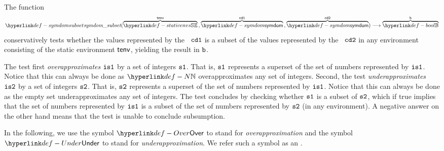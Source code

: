 \hypertarget{def-symdomsubset}{}
The function
\[
  \symdomsubset(
    \overname{\staticenvs}{\tenv} \aslsep
    \overname{\symdom}{\cdone} \aslsep
    \overname{\symdom}{\cdtwo}
  ) \aslto
  \overname{\Bool}{\vb}
\]
conservatively tests whether the values represented by the \symbolicdomain\ $\texttt{cd1}$
is a subset of the values represented by the \symbolicdomain\ $\texttt{cd2}$ in any environment
consisting of the static environment $\textsf{tenv}$, yielding the result in $\texttt{b}$.

The test first \emph{overapproximates} $\texttt{is1}$ by a set of integers $\texttt{s1}$.
That is, $\texttt{s1}$ represents a superset of the set of numbers represented by $\texttt{is1}$.
Notice that this can always be done as $\N$ overapproximates any set of integers.
%
Second, the test \emph{underapproximates} $\texttt{is2}$ by a set of integers $\texttt{s2}$.
That is, $\texttt{s2}$ represents a superset of the set of numbers represented by $\texttt{is1}$.
Notice that this can always be done as the empty set underapproximates any set of integers.
%
The test concludes by checking whether $\texttt{s1}$ is a subset of $\texttt{s2}$,
which if true implies that the set of numbers represented by $\texttt{is1}$ is a subset of the
set of numbers represented by $\texttt{s2}$ (in any environment).
A negative answer on the other hand means that the
test is unable to conclude subsumption.

\hypertarget{def-Under}{}
\hypertarget{def-Over}{}
\hypertarget{def-approximationdirectionterm}{}
In the following, we use the symbol $\Over$ to stand for \emph{overapproximation}
and the symbol $\Under$ to stand for \emph{underapproximation}.
We refer such a symbol as an \approximationdirectionterm.

